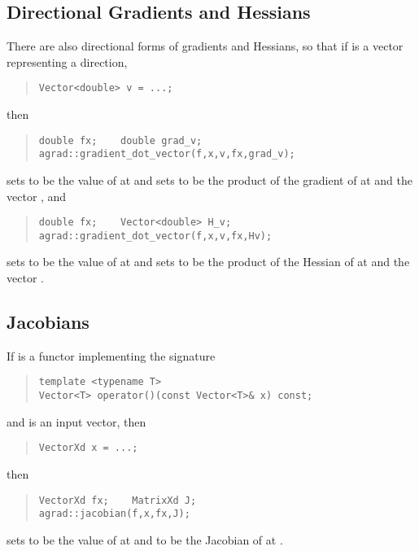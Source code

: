 \documentclass[10pt]{article}
\begin{document}
\subsection{Directional Gradients and Hessians}

There are also directional forms of gradients and Hessians, so that if
 is a vector representing a direction, 
%
\begin{quote}
\begin{Verbatim}
Vector<double> v = ...;
\end{Verbatim}
\end{quote}
%
then
%
\begin{quote}
\begin{Verbatim}
double fx;    double grad_v;
agrad::gradient_dot_vector(f,x,v,fx,grad_v);
\end{Verbatim}
\end{quote}
%
sets  to be the value of  at  and sets
 to be the product of the gradient of  at
 and the vector , and
%
\begin{quote}
\begin{Verbatim}
double fx;    Vector<double> H_v;
agrad::gradient_dot_vector(f,x,v,fx,Hv);
\end{Verbatim}
\end{quote}
%
sets  to be the value of  at  and sets
 to be the product of the Hessian of  at
 and the vector .


\subsection{Jacobians}

If  is a functor implementing the signature
%
\begin{quote}
\begin{Verbatim}
template <typename T>
Vector<T> operator()(const Vector<T>& x) const;
\end{Verbatim}
\end{quote}
%
and  is an input vector, then
%
\begin{quote}
\begin{Verbatim}
VectorXd x = ...;
\end{Verbatim}
\end{quote}
%
then
%
\begin{quote}
\begin{Verbatim}
VectorXd fx;    MatrixXd J;
agrad::jacobian(f,x,fx,J);
\end{Verbatim}
\end{quote}
%
sets  to be the value of  at  and 
 to be the Jacobian of  at .




\end{document}
